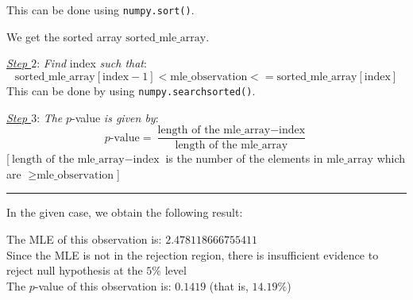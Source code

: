 \documentclass[11pt]{article}
\begin{document}
This can be done using \verb+numpy.sort()+.

We get the sorted array $\text{sorted\_mle\_array}$.

\quad \textit{\underline{Step $2$}}: \textit{Find} index \textit{such that}:
\[
\text{sorted\_mle\_array} [\text{index} - 1] < \text{mle\_observation} <= \text{sorted\_mle\_array} [\text{index}]
\]
This can be done by using \verb+numpy.searchsorted()+.

\quad \textit{\underline{Step $3$}}: \textit{The} $p$-value \textit{is given by}:
\[
p\text{-value} = \frac{ \text{length of the mle\_array} - \text{index} }{ \text{length of the mle\_array} }
\]
[$\text{length of the mle\_array} - \text{index}$ is the number of the elements in $\text{mle\_array}$ which are $\ge \text{mle\_observation}$]

\rule{\textwidth / 2}{0.4pt}

In the given case, we obtain the following result:

    The MLE of this observation is:  $2.478118666755411$
\\  Since the MLE is not in the rejection region, there is insufficient evidence to reject null hypothesis at the $5\%$ level
\\  The $p$-value of this observation is:  $0.1419$ (that is, $14.19 \%$)
\end{document}
